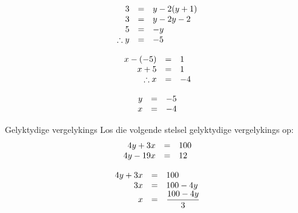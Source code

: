 \begin{aktiwiteit}{}
\begin{wex}
{
\begin{equation*}
    \begin{array}{ccl}\hfill 3& =& y-2(y+1)\hfill \\
	\hfill 3& =& y - 2y - 2\hfill \\
	\hfill 5& =& -y\hfill \\
\hfill \therefore y& =& -5\hfill
    \end{array}
\end{equation*}

\begin{equation*}
    \begin{array}{ccl}\hfill x - (-5)& =& 1\hfill \\
	\hfill x+ 5& =& 1\hfill \\
\hfill \therefore x& =& -4\hfill
    \end{array}
\end{equation*}


\begin{equation*}
\begin{array}{ccl}\hfill y& =& -5\hfill \\
 \hfill x& =& -4\hfill 
\end{array}
\end{equation*}
}
\end{wex}

\begin{wex}
{Gelyktydige vergelykings}
{
Los die volgende stelsel gelyktydige vergelykings op:
\begin{equation*}
\begin{array}{ccc}\hfill 4y+3x& =& 100\hfill \\ 
\hfill 4y - 19x& =& 12\hfill 
\end{array}
\end{equation*}
}
{
\begin{equation*}
    \begin{array}{ccl}\hfill 4y+3x & =& 100\hfill \\
\hfill 3x &=& 100 - 4y \hfill \\
\hfill x& =& \dfrac{100 - 4y}{3} \hfill
    \end{array}
\end{equation*}


}
\end{wex}
\end{aktiwiteit}
